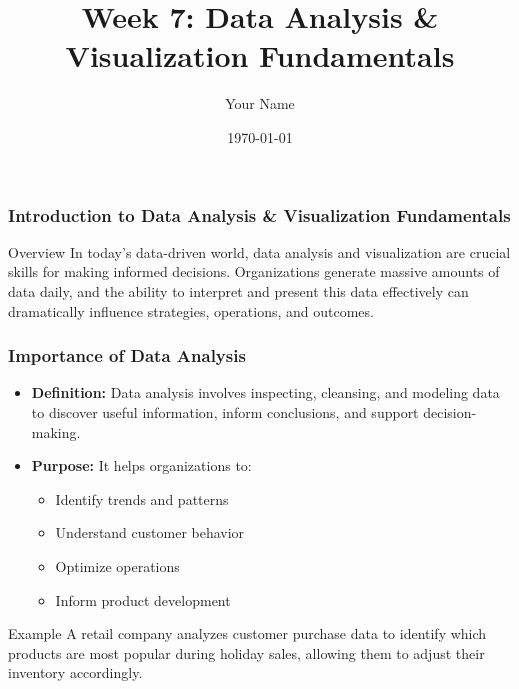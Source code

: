 \documentclass{beamer}
\title{Week 7: Data Analysis \& Visualization Fundamentals}
\author{Your Name}
\institute{Your Institution}
\date{\today}
\begin{document}
\frame{\titlepage}

\begin{frame}[fragile]
    \frametitle{Introduction to Data Analysis \& Visualization Fundamentals}
    \begin{block}{Overview}
        In today's data-driven world, data analysis and visualization are crucial skills for making informed decisions. Organizations generate massive amounts of data daily, and the ability to interpret and present this data effectively can dramatically influence strategies, operations, and outcomes.
    \end{block}
\end{frame}

\begin{frame}[fragile]
    \frametitle{Importance of Data Analysis}
    \begin{itemize}
        \item \textbf{Definition:} Data analysis involves inspecting, cleansing, and modeling data to discover useful information, inform conclusions, and support decision-making.
        \item \textbf{Purpose:} It helps organizations to:
        \begin{itemize}
            \item Identify trends and patterns
            \item Understand customer behavior
            \item Optimize operations
            \item Inform product development
        \end{itemize}
    \end{itemize}
    \begin{block}{Example}
        A retail company analyzes customer purchase data to identify which products are most popular during holiday sales, allowing them to adjust their inventory accordingly.
    \end{block}
\end{frame}
\end{document}
